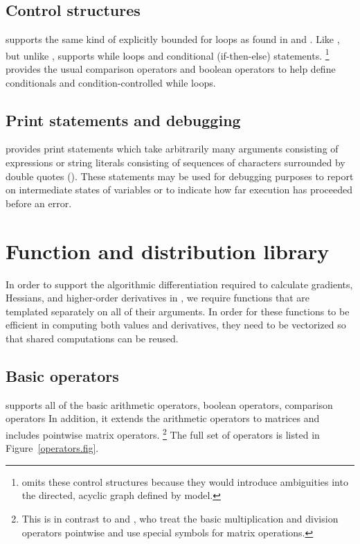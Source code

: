 \documentclass[article]{jss}
\begin{document}
\subsection{Control structures}

 supports the same kind of explicitly bounded for loops
as found in  and .  Like , but unlike
,  supports while loops and conditional
(if-then-else) statements.%
%
\footnote{ omits these control structures because they
  would introduce ambiguities into the directed, acyclic graph defined
  by model.}
%
 provides the usual comparison operators and boolean
operators to help define conditionals and condition-controlled while
loops.  

\subsection{Print statements and debugging}

 provides print statements which take arbitrarily many
arguments consisting of expressions or string literals consisting of
sequences of characters surrounded by double quotes ().
These statements may be used for debugging purposes to report on
intermediate states of variables or to indicate how far execution has
proceeded before an error.

\section{Function and distribution library}

In order to support the algorithmic differentiation required to
calculate gradients, Hessians, and higher-order derivatives in
, we require  functions that are 
templated separately on all of their arguments.  In order for these
functions to be efficient in computing both values and derivatives,
they need to be vectorized so that shared computations can be reused.

\subsection{Basic operators}

 supports all of the basic  arithmetic
operators, boolean operators, comparison operators  In addition, it
extends the arithmetic operators to matrices and includes pointwise
matrix operators.%
%
\footnote{This is in contrast to  and , who
  treat the basic multiplication and division operators pointwise and
  use special symbols for matrix operations.}
%
The full set of operators is listed in Figure~\ref{operators.fig}.
\end{document}
